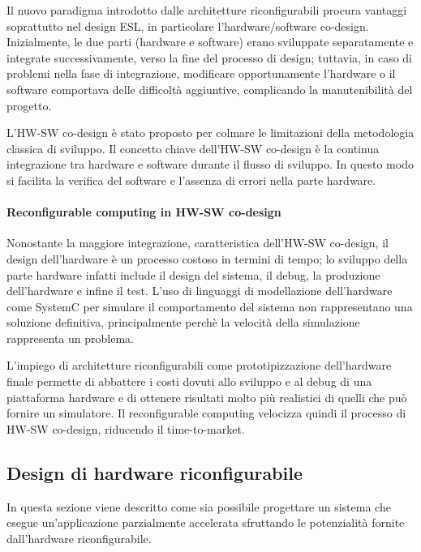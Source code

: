Il nuovo paradigma introdotto dalle architetture riconfigurabili procura vantaggi
soprattutto nel design \ac{ESL}, in particolare l'\mbox{hardware/software} co-design.
Inizialmente, le due parti (hardware e software) erano sviluppate separatamente e integrate
successivamente, verso la fine del processo di design; tuttavia, in caso di problemi nella fase di
integrazione, modificare opportunamente l'hardware o il software comportava delle difficoltà
aggiuntive, complicando la manutenibilità del progetto.

L'HW-SW co-design è stato proposto per colmare le limitazioni della metodologia classica di
sviluppo. Il concetto chiave dell'HW-SW co-design è la continua integrazione tra hardware e software
durante il flusso di sviluppo. In questo modo si facilita la verifica del software e l'assenza di
errori nella parte hardware.

\paragraph{Reconfigurable computing in HW-SW co-design}
Nonostante la maggiore integrazione, caratteristica dell'HW-SW co-design, il design dell'hardware
è un processo costoso in termini di tempo; lo sviluppo della parte hardware infatti include il
design del sistema, il debug, la produzione dell'hardware e infine il test. L'uso di linguaggi
di modellazione dell'hardware come SystemC \cite{SystemCBook} per simulare il comportamento del
sistema non rappresentano una soluzione definitiva, principalmente perchè la velocità della
simulazione rappresenta un problema.

L'impiego di architetture riconfigurabili come prototipizzazione dell'hardware finale permette
di abbattere i costi dovuti allo sviluppo e al debug di una piattaforma hardware e di ottenere
risultati molto più realistici di quelli che può fornire un simulatore. Il reconfigurable
computing velocizza quindi il processo di HW-SW co-design, riducendo il time-to-market.

\subsection{Design di hardware riconfigurabile}
In questa sezione viene descritto come sia possibile progettare un sistema che esegue
un'applicazione parzialmente accelerata sfruttando le potenzialità fornite dall'hardware
riconfigurabile.

